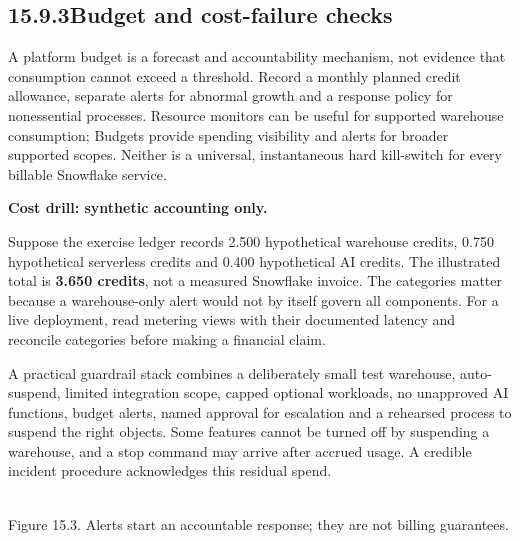 \documentclass[11pt,twoside]{article}
\newcommand{\topic}[2]{\subsection*{#1\quad #2}}
\begin{document}
\newpage

\topic{15.9.3}{Budget and cost-failure checks}
A platform budget is a forecast and accountability mechanism, not evidence that consumption cannot exceed a threshold. Record a monthly planned credit allowance, separate alerts for abnormal growth and a response policy for nonessential processes. Resource monitors can be useful for supported warehouse consumption; Budgets provide spending visibility and alerts for broader supported scopes. Neither is a universal, instantaneous hard kill-switch for every billable Snowflake service.
\begin{whitebox}\textbf{Cost drill: synthetic accounting only.}\par
Suppose the exercise ledger records 2.500 hypothetical warehouse credits, 0.750 hypothetical serverless credits and 0.400 hypothetical AI credits. The illustrated total is \textbf{3.650 credits}, not a measured Snowflake invoice. The categories matter because a warehouse-only alert would not by itself govern all components. For a live deployment, read metering views with their documented latency and reconcile categories before making a financial claim.\end{whitebox}
A practical guardrail stack combines a deliberately small test warehouse, auto-suspend, limited integration scope, capped optional workloads, no unapproved AI functions, budget alerts, named approval for escalation and a rehearsed process to suspend the right objects. Some features cannot be turned off by suspending a warehouse, and a stop command may arrive after accrued usage. A credible incident procedure acknowledges this residual spend.
\begin{center}\\{\fontsize{8}{9}\selectfont\color{inkgray}Figure 15.3. Alerts start an accountable response; they are not billing guarantees.}\end{center}
\end{document}
